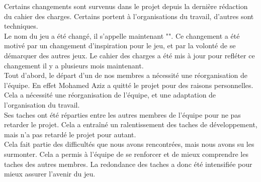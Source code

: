 
Certains changements sont survenus dans le projet depuis la dernière rédaction du cahier des charges. Certains portent à l'organisations du travail, d'autres sont techniques. 
\\

Le nom du jeu a été changé, il s'appelle maintenant "\gameName". Ce changement a été motivé par un changement d'inspiration pour le jeu, et par la volonté de se démarquer des autres jeux. Le cahier des charges a été mis à jour pour refléter ce changement il y a plusieurs mois maintenant.
\\

Tout d'abord, le départ d'un de nos membres a nécessité une réorganisation de l'équipe. En effet Mohamed Aziz a quitté le projet pour des raisons personnelles. Cela a nécessité une réorganisation de l'équipe, et une adaptation de l'organisation du travail.
\\

Ses taches ont été réparties entre les autres membres de l'équipe pour ne pas retarder le projet. Cela a entraîné un ralentissement des taches de développement, mais n'a pas retardé le projet pour autant.
\\
Cela fait partie des difficultés que nous avons rencontrées, mais nous avons su les surmonter. Cela a permis à l'équipe de se renforcer et de mieux comprendre les taches des autres membres. La redondance des taches a donc été intensifiée pour mieux assurer l'avenir du jeu.